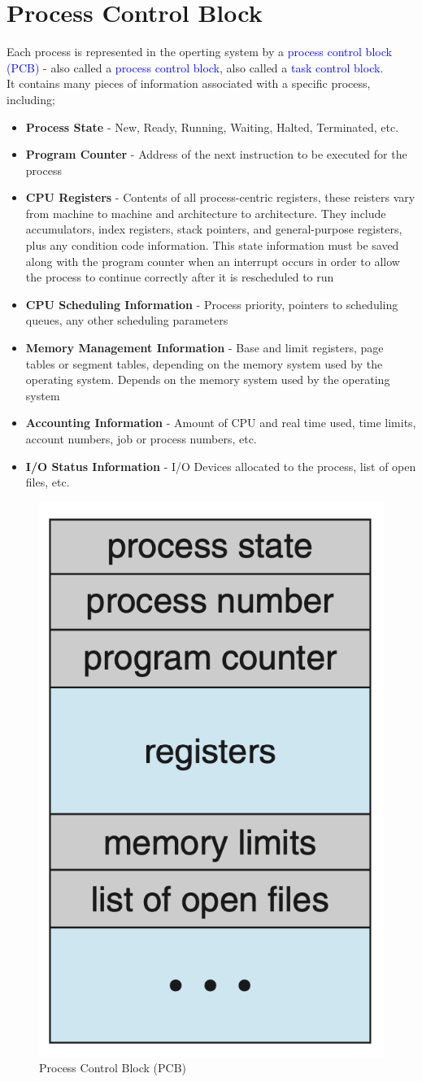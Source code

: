 \documentclass{book/custombook}
\begin{document}
        \section{Process Control Block}
            Each process is represented in the operting system by a \textcolor{blue}{process control block (PCB)} - also called a \textcolor{blue}{process control block},
            also called a \textcolor{blue}{task control block}.\\
            It contains many pieces of information associated with a specific process, including;
            \begin{itemize}
                \item \textbf{Process State} - New, Ready, Running, Waiting, Halted, Terminated, etc.
                \item \textbf{Program Counter} - Address of the next instruction to be executed for the process
                \item \textbf{CPU Registers} - Contents of all process-centric registers, these reisters vary from machine to machine and architecture to architecture. They include accumulators, index registers, stack pointers, and general-purpose registers, plus any condition code information. This state information must be saved along with the program counter when an interrupt occurs in order to allow the process to continue correctly after it is rescheduled to run
                \item \textbf{CPU Scheduling Information} - Process priority, pointers to scheduling queues, any other scheduling parameters
                \item \textbf{Memory Management Information} - Base and limit registers, page tables or segment tables, depending on the memory system used by the operating system. Depends on the memory system used by the operating system
                \item \textbf{Accounting Information} - Amount of CPU and real time used, time limits, account numbers, job or process numbers, etc.
                \item \textbf{I/O Status Information} - I/O Devices allocated to the process, list of open files, etc.
            \end{itemize}
            \begin{figure}[H]
                \centering
                \includegraphics[width=0.2\linewidth]{figures/process_control_block.png}
                \caption{Process Control Block (PCB)}
            \end{figure}
\end{document}
